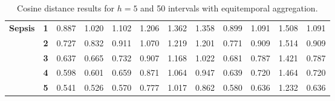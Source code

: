 \begin{table}[htbp]
{\begin{tabular}{|cl|rrrrrrrrrr|}
    \midrule
    \multirow{5}[2]{*}{\textbf{Sepsis}} & \textbf{1} & \cellcolor[rgb]{ .78,  .78,  .78}0.887 & \cellcolor[rgb]{ .753,  .753,  .753}1.020 & \cellcolor[rgb]{ .737,  .737,  .737}1.102 & \cellcolor[rgb]{ .714,  .714,  .714}1.206 & \cellcolor[rgb]{ .682,  .682,  .682}1.362 & \cellcolor[rgb]{ .686,  .686,  .686}1.358 & \cellcolor[rgb]{ .776,  .776,  .776}0.899 & \cellcolor[rgb]{ .737,  .737,  .737}1.091 & \cellcolor[rgb]{ .655,  .655,  .655}1.508 & \cellcolor[rgb]{ .737,  .737,  .737}1.091 \\
          & \textbf{2} & \cellcolor[rgb]{ .812,  .812,  .812}0.727 & \cellcolor[rgb]{ .792,  .792,  .792}0.832 & \cellcolor[rgb]{ .776,  .776,  .776}0.911 & \cellcolor[rgb]{ .741,  .741,  .741}1.070 & \cellcolor[rgb]{ .714,  .714,  .714}1.219 & \cellcolor[rgb]{ .718,  .718,  .718}1.201 & \cellcolor[rgb]{ .804,  .804,  .804}0.771 & \cellcolor[rgb]{ .776,  .776,  .776}0.909 & \cellcolor[rgb]{ .651,  .651,  .651}1.514 & \cellcolor[rgb]{ .776,  .776,  .776}0.909 \\
          & \textbf{3} & \cellcolor[rgb]{ .831,  .831,  .831}0.637 & \cellcolor[rgb]{ .824,  .824,  .824}0.665 & \cellcolor[rgb]{ .812,  .812,  .812}0.732 & \cellcolor[rgb]{ .776,  .776,  .776}0.907 & \cellcolor[rgb]{ .722,  .722,  .722}1.168 & \cellcolor[rgb]{ .753,  .753,  .753}1.022 & \cellcolor[rgb]{ .82,  .82,  .82}0.681 & \cellcolor[rgb]{ .8,  .8,  .8}0.787 & \cellcolor[rgb]{ .671,  .671,  .671}1.421 & \cellcolor[rgb]{ .8,  .8,  .8}0.787 \\
          & \textbf{4} & \cellcolor[rgb]{ .839,  .839,  .839}0.598 & \cellcolor[rgb]{ .839,  .839,  .839}0.601 & \cellcolor[rgb]{ .827,  .827,  .827}0.659 & \cellcolor[rgb]{ .784,  .784,  .784}0.871 & \cellcolor[rgb]{ .745,  .745,  .745}1.064 & \cellcolor[rgb]{ .769,  .769,  .769}0.947 & \cellcolor[rgb]{ .831,  .831,  .831}0.639 & \cellcolor[rgb]{ .816,  .816,  .816}0.720 & \cellcolor[rgb]{ .663,  .663,  .663}1.464 & \cellcolor[rgb]{ .816,  .816,  .816}0.720 \\
          & \textbf{5} & \cellcolor[rgb]{ .851,  .851,  .851}0.541 & \cellcolor[rgb]{ .851,  .851,  .851}0.526 & \cellcolor[rgb]{ .843,  .843,  .843}0.570 & \cellcolor[rgb]{ .804,  .804,  .804}0.777 & \cellcolor[rgb]{ .753,  .753,  .753}1.017 & \cellcolor[rgb]{ .784,  .784,  .784}0.862 & \cellcolor[rgb]{ .843,  .843,  .843}0.580 & \cellcolor[rgb]{ .831,  .831,  .831}0.636 & \cellcolor[rgb]{ .71,  .71,  .71}1.232 & \cellcolor[rgb]{ .831,  .831,  .831}0.636 \\
    \bottomrule
    \end{tabular}
    }
  \caption{Cosine distance results for $h=5$ and 50 intervals with equitemporal aggregation.}
  \label{tab:equitemp_50}%
\end{table}%
